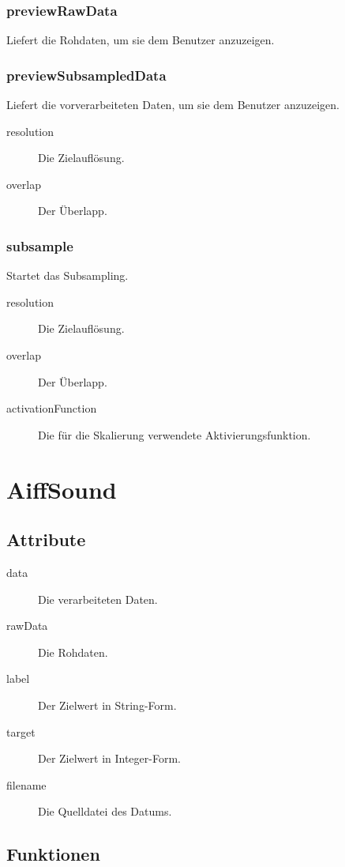 \documentclass[a4paper,10pt]{scrartcl}
\begin{document}
\subsubsection{previewRawData}
Liefert die Rohdaten, um sie dem Benutzer anzuzeigen.

\subsubsection{previewSubsampledData}
Liefert die vorverarbeiteten Daten, um sie dem Benutzer anzuzeigen.
\begin{description}
\item[resolution] Die Zielauflösung.
\item[overlap] Der Überlapp.
\end{description}

\subsubsection{subsample}
Startet das Subsampling.
\begin{description}
\item[resolution] Die Zielauflösung.
\item[overlap] Der Überlapp.
\item[activationFunction] Die für die Skalierung verwendete Aktivierungsfunktion.
\end{description}


\section{AiffSound}

\subsection{Attribute}

\begin{description}
\item[data] Die verarbeiteten Daten.
\item[rawData] Die Rohdaten.
\item[label] Der Zielwert in String-Form.
\item[target] Der Zielwert in Integer-Form.
\item[filename] Die Quelldatei des Datums.
\end{description}

\subsection{Funktionen}
\end{document}
